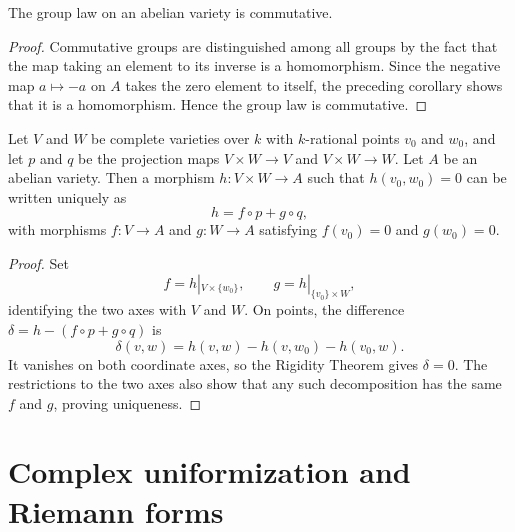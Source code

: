 \begin{corollary}
\label{cor:milne-abelian-commutativity}

The group law on an abelian variety is commutative.
\end{corollary}

\begin{proof}
Commutative groups are distinguished among all groups by the fact that the map
taking an element to its inverse is a homomorphism.  Since the negative map
$a\mapsto-a$ on $A$ takes the zero element to itself, the preceding corollary
shows that it is a homomorphism.  Hence the group law is commutative.
\end{proof}

\begin{corollary}
\label{cor:milne-abelian-product-decomposition}

Let $V$ and $W$ be complete varieties over $k$ with $k$-rational points
$v_0$ and $w_0$, and let $p$ and $q$ be the projection maps
$V\times W\to V$ and $V\times W\to W$.  Let $A$ be an abelian variety.  Then
a morphism $h:V\times W\to A$ such that $h(v_0,w_0)=0$ can be written
uniquely as
\[
 h=f\circ p+g\circ q,
\]
with morphisms $f:V\to A$ and $g:W\to A$ satisfying
$f(v_0)=0$ and $g(w_0)=0$.
\end{corollary}

\begin{proof}
Set
\[
 f=h|_{V\times\{w_0\}},\qquad
 g=h|_{\{v_0\}\times W},
\]
identifying the two axes with $V$ and $W$.  On points, the difference
$\delta=h-(f\circ p+g\circ q)$ is
\[
 \delta(v,w)=h(v,w)-h(v,w_0)-h(v_0,w).
\]
It vanishes on both coordinate axes, so the Rigidity Theorem gives
$\delta=0$.  The restrictions to the two axes also show that any such
decomposition has the same $f$ and $g$, proving uniqueness.
\end{proof}

\section{Complex uniformization and Riemann forms}

